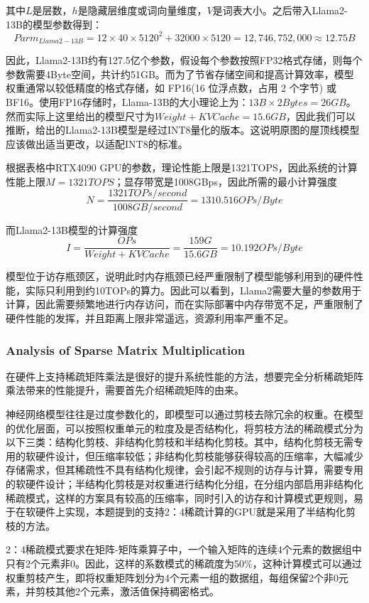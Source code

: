\documentclass[11pt, a4 paper]{article}
\begin{document}
其中$L$是层数，$h$是隐藏层维度或词向量维度，$V$是词表大小。之后带入Llama2-13B的模型参数得到：
$$Parm_{Llama2-13B} = 12 \times 40 \times 5120^2 + 32000 \times 5120 = 12,746,752,000 \approx 12.75B$$

因此，Llama2-13B约有127.5亿个参数，假设每个参数按照FP32格式存储，则每个参数需要4Byte空间，共计约51GB。而为了节省存储空间和提高计算效率，模型权重通常以较低精度的格式存储，如 FP16(16 位浮点数，占用 2 个字节) 或BF16。使用FP16存储时，Llama-13B的大小理论上为：$13B \times 2 Bytes = 26GB$。
然而实际上这里给出的模型尺寸为$Weight + KV Cache = 15.6GB$，因此我们可以推断，给出的Llama2-13B模型是经过INT8量化的版本。这说明原图的屋顶线模型应该做出适当更改，以适配INT8的标准。

根据表格中RTX4090 GPU的参数，理论性能上限是1321TOPS，因此系统的计算性能上限$M = 1321TOPS$；显存带宽是1008GBps，因此所需的最小计算强度
$$N = \frac{1321TOPs/second}{1008GB/second} = 1310.516OPs/Byte$$

而Llama2-13B模型的计算强度
$$ I = \frac{OPs}{Weight + KV Cache} = \frac{159G}{15.6GB} = 10.192OPs/Byte$$

模型位于访存瓶颈区，说明此时内存瓶颈已经严重限制了模型能够利用到的硬件性能，实际只利用到约10TOPs的算力。因此可以看到，Llama2需要大量的参数用于计算，因此需要频繁地进行内存访问，而在实际部署中内存带宽不足，严重限制了硬件性能的发挥，并且距离上限非常遥远，资源利用率严重不足。
\subsubsection{Analysis of Sparse Matrix Multiplication}
在硬件上支持稀疏矩阵乘法是很好的提升系统性能的方法，想要完全分析稀疏矩阵乘法带来的性能提升，需要首先介绍稀疏矩阵的由来。

神经网络模型往往是过度参数化的，即模型可以通过剪枝去除冗余的权重。在模型的优化层面，可以按照权重单元的粒度及是否结构化，将剪枝方法的稀疏模式分为以下三类：结构化剪枝、非结构化剪枝和半结构化剪枝。其中，结构化剪枝无需专用的软硬件设计，但压缩率较低；非结构化剪枝能够获得较高的压缩率，大幅减少存储需求，但其稀疏性不具有结构化规律，会引起不规则的访存与计算，需要专用的软硬件设计；半结构化剪枝是对权重进行结构化分组，在分组内部启用非结构化稀疏模式，这样的方案具有较高的压缩率，同时引入的访存和计算模式更规则，易于在软硬件上实现，本题提到的支持2：4稀疏计算的GPU就是采用了半结构化剪枝的方法。

2：4稀疏模式要求在矩阵-矩阵乘算子中，一个输入矩阵的连续4个元素的数据组中只有2个元素非0。因此，这样的系数模式的稀疏度为50\%，这种计算模式可以通过权重剪枝产生，即将权重矩阵划分为4个元素一组的数据组，每组保留2个非0元素，并剪枝其他2个元素，激活值保持稠密格式。
\end{document}
